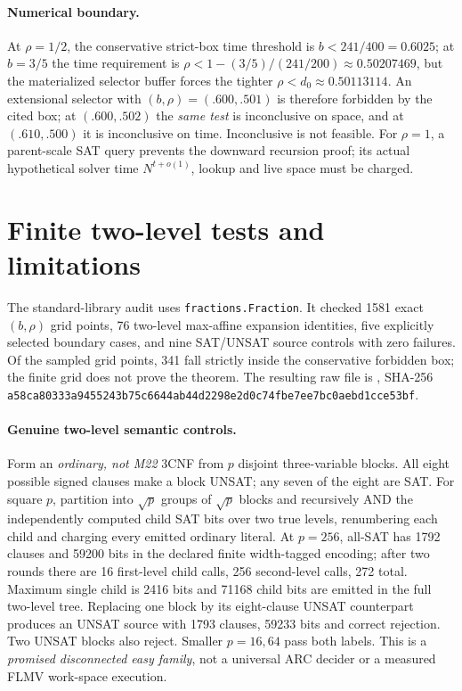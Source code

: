 \documentclass[11pt]{article}
\begin{document}
\paragraph{Numerical boundary.}
At $\rho=1/2$, the conservative strict-box time threshold is $b<241/400=0.6025$; at $b=3/5$ the time requirement is $\rho<1-(3/5)/(241/200)\approx0.50207469$, but the materialized selector buffer forces the tighter $\rho<d_0\approx0.50113114$. An extensional selector with $(b,\rho)=(.600,.501)$ is therefore forbidden by the cited box; at $(.600,.502)$ the \emph{same test} is inconclusive on space, and at $(.610,.500)$ it is inconclusive on time. Inconclusive is not feasible. For $\rho=1$, a parent-scale SAT query prevents the downward recursion proof; its actual hypothetical solver time $N^{t+o(1)}$, lookup and live space must be charged.
\section{Finite two-level tests and limitations}
The standard-library audit  uses \texttt{fractions.Fraction}. It checked 1581 exact $(b,\rho)$ grid points, 76 two-level max-affine expansion identities, five explicitly selected boundary cases, and nine SAT/UNSAT source controls with zero failures. Of the sampled grid points, 341 fall strictly inside the conservative forbidden box; the finite grid does not prove the theorem. The resulting raw file is , SHA-256 \texttt{a58ca80333a9455243b75c6644ab44d2298e2d0c74fbe7ee7bc0aebd1cce53bf}.
\paragraph{Genuine two-level semantic controls.}
Form an \emph{ordinary, not M22} 3CNF from $p$ disjoint three-variable blocks. All eight possible signed clauses make a block UNSAT; any seven of the eight are SAT. For square $p$, partition into $\sqrt p$ groups of $\sqrt p$ blocks and recursively AND the independently computed child SAT bits over two true levels, renumbering each child and charging every emitted ordinary literal. At $p=256$, all-SAT has 1792 clauses and 59200 bits in the declared finite width-tagged encoding; after two rounds there are 16 first-level child calls, 256 second-level calls, 272 total. Maximum single child is 2416 bits and 71168 child bits are emitted in the full two-level tree. Replacing one block by its eight-clause UNSAT counterpart produces an UNSAT source with 1793 clauses, 59233 bits and correct rejection. Two UNSAT blocks also reject. Smaller $p=16,64$ pass both labels. This is a \emph{promised disconnected easy family}, not a universal ARC decider or a measured FLMV work-space execution.
\end{document}
